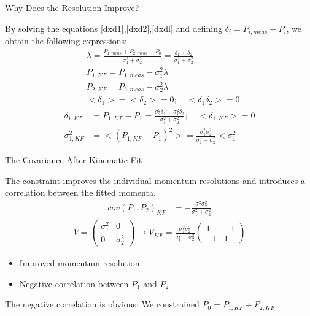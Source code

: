 \documentclass[
	xcolor=dvipsnames,
	aspectratio=169,	
	10pt, 
	]{beamer}
\begin{document}
\begin{frame}{Why Does the Resolution Improve?}
	\begin{block}{}
		By solving the equations \ref{dxd1},\ref{dxd2},\ref{dxdl} and defining $\delta_i = P_{i,meas} - P_i$, we obtain the following expressions:
		\begin{align}
			&\lambda=\frac{P_{1,meas}+P_{2,meas}-P_0}{\sigma_1^2+\sigma_2^2} = \frac{\delta_1 + \delta_2}{\sigma_1^2+\sigma_2^2}\\
			&P_{1,KF}=P_{1,meas}-\sigma_1^2\lambda\\
			&P_{2,KF}=P_{2,meas}-\sigma_2^2\lambda\\
			&<\delta_1> = <\delta_2>= 0;\quad <\delta_1\delta_2> = 0
		\end{align}
		\begin{align}
		\delta_{1,KF} &= P_{1,KF}-P_{1}=\frac{\sigma_2^2\delta_1 -\sigma_1^2\delta_2}{\sigma_1^2+\sigma_2^2};\quad <\delta_{1,KF}> = 0 \\
		\sigma_{1,KF}^2 &= <(P_{1,KF}- P_1)^2> = \frac{\sigma_1^2\sigma_2^2}{\sigma_1^2+\sigma_2^2}<\sigma_1^2
	\end{align}
	\end{block}
\end{frame}
\begin{frame}{The Covariance After Kinematic Fit}
	\begin{block}{}
		The constraint improves the individual momentum resolutions and introduces a correlation between the fitted momenta.
		\begin{align}
			cov(P_{1},P_{2})_{KF}& =-\frac{\sigma_1^2\sigma_2^2}{\sigma_1^2+\sigma_2^2}
		\end{align}
		\begin{align}
			V=\begin{pmatrix}
				\sigma_1^2&0\\
				0&\sigma_2^2
			\end{pmatrix}\to V_{KF} =
			\frac{\sigma_1^2\sigma_2^2}{\sigma_1^2+\sigma_2^2}
			\begin{pmatrix}
						1&-1\\
						-1&1
			\end{pmatrix}
		\end{align}
		\begin{itemize}
			\item Improved momentum resolution
			\item Negative correlation between $P_1$ and $P_2$
		\end{itemize}
		The negative correlation is obvious: We constrained $P_0 = P_{1,KF}+P_{2,KF}$.
	\end{block}
\end{frame}
\end{document}
